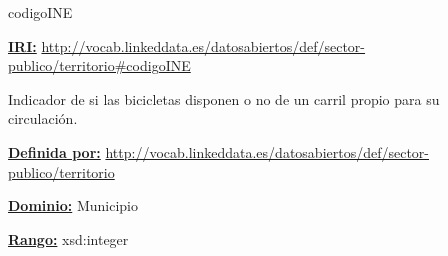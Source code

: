\begin{mybox}{codigoINE}
\begin{flushleft}
\underline{\textbf{IRI:}}
\url{http://vocab.linkeddata.es/datosabiertos/def/sector-publico/territorio#codigoINE}
\newline

Indicador de si las bicicletas disponen o no de un carril propio para su circulación.
\newline


\underline{\textbf{Definida por:}}\newline
\url{http://vocab.linkeddata.es/datosabiertos/def/sector-publico/territorio}
\newline

\underline{\textbf{Dominio:}}
	Municipio
\newline

\underline{\textbf{Rango:}}
	xsd:integer
\newline

\end{flushleft}
\end{mybox}





























